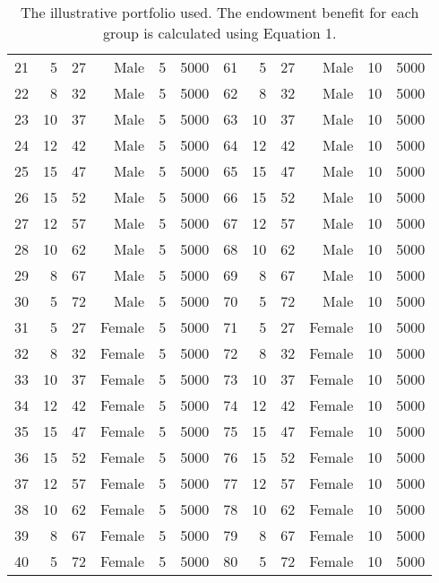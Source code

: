 \begin{table}[!htpb]
\begin{tabular}{lrrrrr|lrrrrr}
  21 & 5 & 27 & Male & 5 & 5000 & 61 & 5 & 27 & Male & 10 & 5000 \\ 
  22 & 8 & 32 & Male & 5 & 5000 & 62 & 8 & 32 & Male & 10 & 5000 \\ 
  23 & 10 & 37 & Male & 5 & 5000 & 63 & 10 & 37 & Male & 10 & 5000 \\ 
  24 & 12 & 42 & Male & 5 & 5000 & 64 & 12 & 42 & Male & 10 & 5000 \\ 
  25 & 15 & 47 & Male & 5 & 5000 & 65 & 15 & 47 & Male & 10 & 5000 \\ 
  26 & 15 & 52 & Male & 5 & 5000 & 66 & 15 & 52 & Male & 10 & 5000 \\ 
  27 & 12 & 57 & Male & 5 & 5000 & 67 & 12 & 57 & Male & 10 & 5000 \\ 
  28 & 10 & 62 & Male & 5 & 5000 & 68 & 10 & 62 & Male & 10 & 5000 \\ 
  29 & 8 & 67 & Male & 5 & 5000 & 69 & 8 & 67 & Male & 10 & 5000 \\ 
  30 & 5 & 72 & Male & 5 & 5000 & 70 & 5 & 72 & Male & 10 & 5000 \\ 
  31 & 5 & 27 & Female & 5 & 5000 & 71 & 5 & 27 & Female & 10 & 5000 \\ 
  32 & 8 & 32 & Female & 5 & 5000 & 72 & 8 & 32 & Female & 10 & 5000 \\ 
  33 & 10 & 37 & Female & 5 & 5000 & 73 & 10 & 37 & Female & 10 & 5000 \\ 
  34 & 12 & 42 & Female & 5 & 5000 & 74 & 12 & 42 & Female & 10 & 5000 \\ 
  35 & 15 & 47 & Female & 5 & 5000 & 75 & 15 & 47 & Female & 10 & 5000 \\ 
  36 & 15 & 52 & Female & 5 & 5000 & 76 & 15 & 52 & Female & 10 & 5000 \\ 
  37 & 12 & 57 & Female & 5 & 5000 & 77 & 12 & 57 & Female & 10 & 5000 \\ 
  38 & 10 & 62 & Female & 5 & 5000 & 78 & 10 & 62 & Female & 10 & 5000 \\ 
  39 & 8 & 67 & Female & 5 & 5000 & 79 & 8 & 67 & Female & 10 & 5000 \\ 
  40 & 5 & 72 & Female & 5 & 5000 & 80 & 5 & 72 & Female & 10 & 5000 \\ 
   \hline
\end{tabular}
\endgroup
\caption{The illustrative portfolio used. The endowment benefit for each group is calculated using Equation 1.} 
\label{tab:groupstable}
\end{table}

